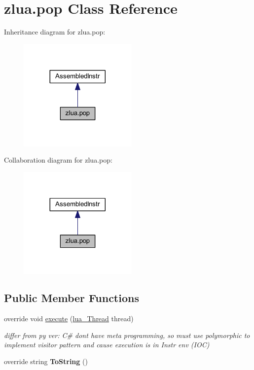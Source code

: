 \hypertarget{classzlua_1_1pop}{}\section{zlua.\+pop Class Reference}
\label{classzlua_1_1pop}


Inheritance diagram for zlua.\+pop\+:
\nopagebreak
\begin{figure}[H]
\begin{center}
\leavevmode
\includegraphics[width=164pt]{classzlua_1_1pop__inherit__graph}
\end{center}
\end{figure}


Collaboration diagram for zlua.\+pop\+:
\nopagebreak
\begin{figure}[H]
\begin{center}
\leavevmode
\includegraphics[width=164pt]{classzlua_1_1pop__coll__graph}
\end{center}
\end{figure}
\subsection*{Public Member Functions}
\begin{DoxyCompactItemize}
\item 
override void \mbox{\hyperlink{classzlua_1_1pop_a72cea959966aec69448d61be5bfc322c}{execute}} (\mbox{\hyperlink{classzlua_1_1lua___thread}{lua\+\_\+\+Thread}} thread)
\begin{DoxyCompactList}\small\item\em differ from py ver\+: C\# dont have meta programming, so must use polymorphic to implement visitor pattern and cause execution is in Instr env (I\+OC) \end{DoxyCompactList}\item 
\mbox{\label{classzlua_1_1pop_ae497911a38afede3ce5c680583fd7a37}} 
override string {\bfseries To\+String} ()
\end{DoxyCompactItemize}
